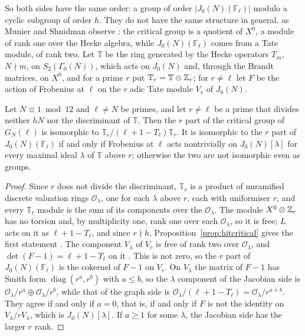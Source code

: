 So both sides have the same order: a group of order $|J_0(N)(\mathbb F_\ell)|$ modulo a cyclic subgroup of order $h$. They do not have the same structure in general, as Munier and Shnidman observe \cite{muniershnidman2023}: the critical group is a quotient of $X^0$, a module of rank one over the Hecke algebra, while $J_0(N)(\mathbb F_\ell)$ comes from a Tate module, of rank two. Let $\mathbb T$ be the ring generated by the Hecke operators $T_m$, $N\nmid m$, on $S_2(\Gamma_0(N))$, which acts on $J_0(N)$ and, through the Brandt matrices, on $X^0$, and for a prime $r$ put $\mathbb T_r=\mathbb T\otimes\mathbb{Z}_r$; for $r\ne\ell$ let $F$ be the action of Frobenius at $\ell$ on the $r$ adic Tate module $V_r$ of $J_0(N)$.

\begin{proposition}\label{prop:hitsandpile}
Let $N\equiv1\bmod12$ and $\ell\ne N$ be primes, and let $r\ne\ell$ be a prime that divides neither $hN$ nor the discriminant of $\mathbb T$. Then the $r$ part of the critical group of $G_N(\ell)$ is isomorphic to $\mathbb T_r/(\ell+1-T_\ell)\mathbb T_r$. It is isomorphic to the $r$ part of $J_0(N)(\mathbb F_\ell)$ if and only if Frobenius at $\ell$ acts nontrivially on $J_0(N)[\lambda]$ for every maximal ideal $\lambda$ of $\mathbb T$ above $r$; otherwise the two are not isomorphic even as groups.
\end{proposition}

\begin{proof}
Since $r$ does not divide the discriminant, $\mathbb T_r$ is a product of unramified discrete valuation rings $\mathcal O_\lambda$, one for each $\lambda$ above $r$, each with uniformiser $r$, and every $\mathbb T_r$ module is the sum of its components over the $\mathcal O_\lambda$. The module $X^0\otimes\mathbb{Z}_r$ has no torsion and, by multiplicity one, rank one over each $\mathcal O_\lambda$, so it is free; $L$ acts on it as $\ell+1-T_\ell$, and since $r\nmid h$, Proposition~\ref{prop:hitcritical} gives the first statement \cite[Proposition~3.4]{muniershnidman2023}. The component $V_\lambda$ of $V_r$ is free of rank two over $\mathcal O_\lambda$, and $\det(F-1)=\ell+1-T_\ell$ on it \cite[Proposition~3.6]{muniershnidman2023}. This is not zero, so the $r$ part of $J_0(N)(\mathbb F_\ell)$ is the cokernel of $F-1$ on $V_r$. On $V_\lambda$ the matrix of $F-1$ has Smith form $\operatorname{diag}(r^a,r^b)$ with $a\le b$, so the $\lambda$ component of the Jacobian side is $\mathcal O_\lambda/r^a\oplus\mathcal O_\lambda/r^b$, while that of the graph side is $\mathcal O_\lambda/(\ell+1-T_\ell)=\mathcal O_\lambda/r^{a+b}$. They agree if and only if $a=0$, that is, if and only if $F$ is not the identity on $V_\lambda/rV_\lambda$, which is $J_0(N)[\lambda]$. If $a\ge1$ for some $\lambda$, the Jacobian side has the larger $r$ rank.
\end{proof}

